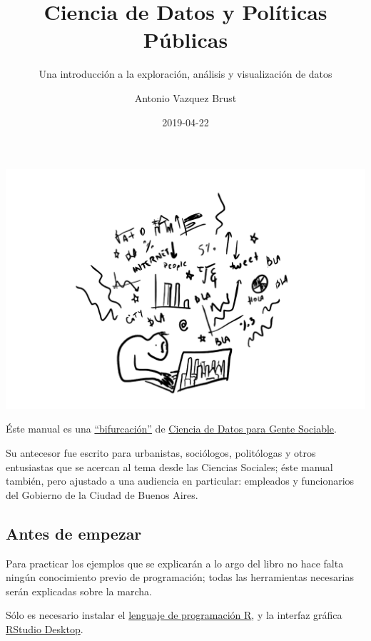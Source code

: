\documentclass[]{book}
\title{Ciencia de Datos y Políticas Públicas}
\subtitle{Una introducción a la exploración, análisis y visualización de datos}
\author{Antonio Vazquez Brust}
\date{2019-04-22}
\begin{document}
\maketitle

{
\setcounter{tocdepth}{1}
\tableofcontents
}
\chapter*{}\label{section}

\includegraphics[width=1\linewidth]{imagenes/portada}

Éste manual es una
\href{https://es.wikipedia.org/wiki/Bifurcaci\%C3\%B3n_(desarrollo_de_software)}{``bifurcación''}
de
\href{https://bitsandbricks.github.io/ciencia_de_datos_gente_sociable/}{Ciencia
de Datos para Gente Sociable}.

Su antecesor fue escrito para urbanistas, sociólogos, politólogas y
otros entusiastas que se acercan al tema desde las Ciencias Sociales;
éste manual también, pero ajustado a una audiencia en particular:
empleados y funcionarios del Gobierno de la Ciudad de Buenos Aires.

\section*{Antes de empezar}\label{antes-de-empezar}

Para practicar los ejemplos que se explicarán a lo argo del libro no
hace falta ningún conocimiento previo de programación; todas las
herramientas necesarias serán explicadas sobre la marcha.

Sólo es necesario instalar el
\href{https://cloud.r-project.org/}{lenguaje de programación R}, y la
interfaz gráfica
\href{https://www.rstudio.com/products/rstudio/download/}{RStudio
Desktop}.
\end{document}
